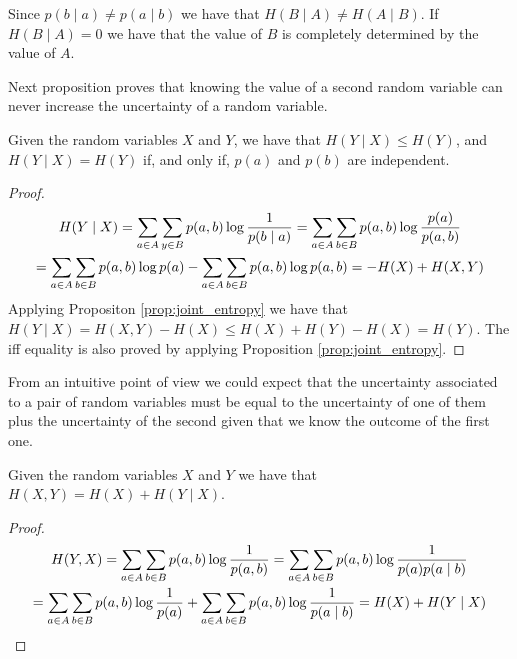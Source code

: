 Since $p(b \mid a) \neq p(a \mid b)$ we have that $H(B \mid A) \neq H(A \mid B)$. If $H(B \mid A) = 0$ we have that the value of $B$ is completely determined by the value of $A$.

Next proposition proves that knowing the value of a second random variable can never increase the uncertainty of a random variable.

\begin{proposition}
Given the random variables $X$ and $Y$, we have that $H(Y \mid X) \leq H(Y)$, and $H(Y \mid X) = H(Y)$ if, and only if, $p(a)$ and $p(b)$ are independent.
\end{proposition}
\begin{proof}
\begin{multline}
H(Y \mid X) = \sum_{a \in A} \sum_{y \in B} p(a, b) \log \frac{1}{p(b \mid a)} = \sum_{a \in A} \sum_{b \in B} p(a, b) \log \frac{p(a)}{p(a, b)} \\
\notag = \sum_{a \in A} \sum_{b \in B} p(a, b) \log p(a) - \sum_{a \in A} \sum_{b \in B} p(a, b) \log p(a, b) = -H(X) + H(X, Y)
\end{multline}
Applying Propositon \ref{prop:joint_entropy} we have that $H(Y \mid X) = H(X, Y) - H(X) \leq H(X) + H(Y) - H(X) = H(Y)$.
The iff equality is also proved by applying Proposition \ref{prop:joint_entropy}.
\end{proof}

From an intuitive point of view we could expect that the uncertainty associated to a pair of random variables must be equal to the uncertainty of one of them plus the uncertainty of the second given that we know the outcome of the first one.

\begin{proposition}
\label{prop:chain_rule_entropy}
Given the random variables $X$ and $Y$ we have that $H(X, Y) = H(X) + H(Y \mid X)$.
\end{proposition}
\begin{proof}
\begin{multline}
H(Y, X) = \sum_{a \in A} \sum_{b \in B} p(a, b) \log \frac{1}{p(a, b)} = \sum_{a \in A} \sum_{b \in B} p(a, b) \log \frac{1}{p(a) p(a \mid b)} \\
\notag = \sum_{a \in A} \sum_{b \in B} p(a, b) \log \frac{1}{p(a)} + \sum_{a \in A} \sum_{b \in B} p(a, b) \log \frac{1}{p(a \mid b)} = H(X) + H(Y \mid X)
\end{multline}
\end{proof}


